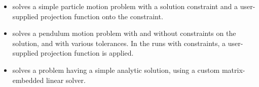 \begin{itemize}
  \newline
  The preconditioner matrix used is the product of two matrices:         
  (1) a matrix, only defined implicitly, based on a fixed number of     
  Gauss--Seidel iterations using the diffusion terms only; and               
  (2) a block-diagonal matrix based on the partial derivatives of the   
  interaction terms only, using block-grouping.                          
  \newline
  Four different runs are made for this problem.                        
  The product preconditioner is applied on the left and on the right.    
  In each case, both the modified and classical Gram--Schmidt options    
  are tested.
\item {} solves a simple particle motion problem
  with a solution constraint and a user-supplied projection function
  onto the constraint.
\item {} solves a pendulum motion problem with and
  without constraints on the solution, and with various tolerances.  In the
  runs with constraints, a user-supplied projection function is applied.
\item {} solves a problem having a simple analytic
  solution, using a custom matrix-embedded linear solver.



\end{itemize}
